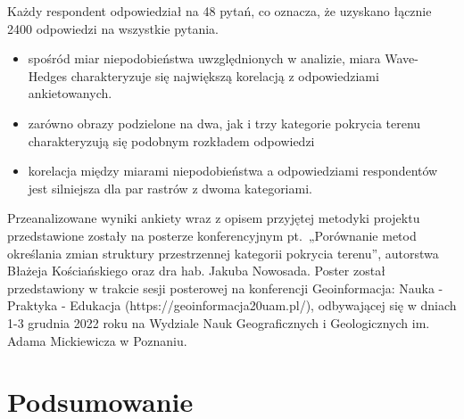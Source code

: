 \documentclass{amuthesis}
\begin{document}
Każdy respondent odpowiedział na 48 pytań, co oznacza, że uzyskano
łącznie 2400 odpowiedzi na wszystkie pytania.

\begin{itemize}
\tightlist
\item
  spośród miar niepodobieństwa uwzględnionych w analizie, miara
  Wave-Hedges charakteryzuje się największą korelacją z odpowiedziami
  ankietowanych.
\item
  zarówno obrazy podzielone na dwa, jak i trzy kategorie pokrycia terenu
  charakteryzują się podobnym rozkładem odpowiedzi
\item
  korelacja między miarami niepodobieństwa a odpowiedziami respondentów
  jest silniejsza dla par rastrów z dwoma kategoriami.
\end{itemize}

Przeanalizowane wyniki ankiety wraz z opisem przyjętej metodyki projektu
przedstawione zostały na posterze konferencyjnym pt.~„Porównanie metod
określania zmian struktury przestrzennej kategorii pokrycia terenu'',
autorstwa Błażeja Kościańskiego oraz dra hab. Jakuba Nowosada. Poster
został przedstawiony w trakcie sesji posterowej na konferencji
Geoinformacja: Nauka - Praktyka - Edukacja
(https://geoinformacja20uam.pl/), odbywającej się w dniach 1-3 grudnia
2022 roku na Wydziale Nauk Geograficznych i Geologicznych im. Adama
Mickiewicza w Poznaniu.


\hypertarget{podsumowanie}{%
\chapter{Podsumowanie}\label{podsumowanie}}

\printbibliography[heading=bibintoc, title=Bibliografia]
\end{document}
